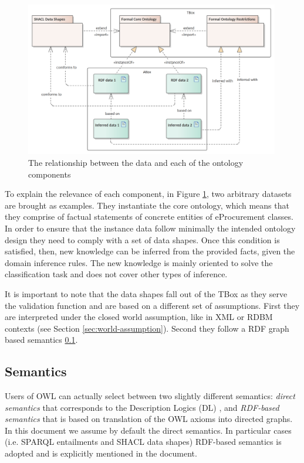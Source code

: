 	\begin{figure}[!ht]
		\centering
		\includegraphics[width=0.99\textwidth]{../img/ontology.png}
		\caption{The relationship between the data and each of the ontology components}
		\label{fig:abox-tbox}
	\end{figure}
	
	To explain the relevance of each component, in Figure \ref{fig:abox-tbox}, two arbitrary datasets are brought as examples. They instantiate the core ontology, which means that they comprise of factual statements of concrete entities of eProcurement classes. In order to ensure that the instance data follow minimally the intended ontology design they need to comply with a set of data shapes. Once this condition is satisfied, then, new knowledge can be inferred from the provided facts, given the domain inference rules. The new knowledge is mainly oriented to solve the classification task and does not cover other types of inference. 	
	
	It is important to note that the data shapes fall out of the TBox as they serve the validation function and are based on a different set of assumptions. First they are interpreted under the closed world assumption, like in XML  or RDBM contexts (see Section \ref{sec:world-assumption}). Second they follow a RDF graph based semantics \ref{sec:semantics}.

	\subsection{Semantics}
	\label{sec:semantics}
	
	Users of OWL \citep{owl2} can actually select between two slightly different semantics: \textit{direct semantics} that corresponds to the Description Logics (DL) \cite{dl-baader2004description}, and \textit{RDF-based semantics} that is based on translation of the OWL axioms into directed graphs. In this document we assume by default the direct semantics. In particular cases (i.e. SPARQL entailments and SHACL data shapes) RDF-based semantics is adopted and is explicitly mentioned in the document. 
	
